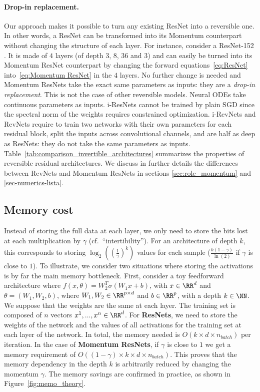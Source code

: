 \documentclass{article}
\begin{document}
\paragraph{Drop-in replacement.}
Our approach makes it possible to turn any existing ResNet into a reversible one.  In other words, a ResNet can be transformed into its Momentum counterpart without changing the structure of each layer. For instance, consider a ResNet-152 \citep{he2015deep}. It is made of $4$ layers (of depth $3$, $8$, $36$ and $3$) and can easily be turned into its Momentum ResNet counterpart 
by changing the forward equations~\eqref{eq:ResNet} 
into~\eqref{eq:Momentum ResNet} in the $4$ layers. No further change is needed and Momentum ResNets take the exact same parameters as inputs: they are a \textit{drop-in replacement}. This is not the case of other reversible models. Neural ODEs \citep{chen2018neural} take continuous parameters as inputs. i-ResNets \citep{behrmann2019invertible} cannot be trained by plain SGD since the spectral norm of the weights requires constrained optimization. i-RevNets \citep{jacobsen2018irevnet} and RevNets \citep{gomez2017reversible} require to train two networks with their own parameters for each residual block, split the inputs across convolutional channels, and are half as deep as ResNets: they do not take the same parameters as inputs. Table~\ref{tab:comparison_invertible_architectures} summarizes the properties of reversible residual architectures.  We discuss in further details the differences between RevNets and Momentum ResNets in sections \ref{sec:role_momentum} and \ref{sec-numerics-lista}.


\subsection{Memory cost}\label{section:memory_cost}

Instead of storing the full data at each layer, we only need to store the bits lost at each multiplication by $\gamma$ (cf.\ ``intertibility''). For an architecture of depth $k$, this corresponds to storing $\log_2((\frac{1}{\gamma})^k) $ values for each sample ($\frac{k (1-\gamma)}{\ln(2)}$ if $\gamma$ is close to $1$).
To illustrate, we consider two situations where storing the activations is by far the main memory bottleneck. First, consider a toy feedforward architecture where $f(x,\theta) = W_2^{T} \sigma(W_1x +b)$, with $x \in \RR^d$ and $\theta = (W_1, W_2, b)$, where $W_1, W_2 \in \RR ^{p\times d}$ and $b \in \RR^p$, with a depth $k \in \NN$. We suppose that the weights are the same at each layer.
The training set is composed of $n$ vectors $x^1,...,x^n \in \RR^d$. 
For \textbf{ResNets}, we need to store the weights of the network and the values of all activations for the training set at each layer of the network.
In total, the memory needed is $O(k \times d \times n_{{batch}})$ per iteration. 
In the case of \textbf{Momentum ResNets}, if $\gamma$ is close to $1$ we get a memory requirement of $O((1-\gamma) \times k \times d \times n_{{batch}} )$.
This proves that the memory dependency in the depth $k$ is arbitrarily reduced by changing the momentum $\gamma$. The memory savings are confirmed in practice, as shown in Figure~\ref{fig:memo_theory}. 
\end{document}
